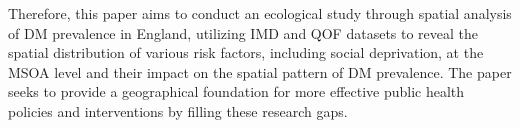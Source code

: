 Therefore, this paper aims to conduct an ecological study through spatial analysis of DM prevalence in England, utilizing IMD and QOF datasets to reveal the spatial distribution of various risk factors, including social deprivation, at the MSOA level and their impact on the spatial pattern of DM prevalence. The paper seeks to provide a geographical foundation for more effective public health policies and interventions by filling these research gaps.